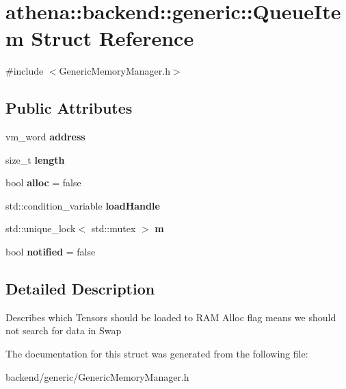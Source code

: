 \hypertarget{structathena_1_1backend_1_1generic_1_1_queue_item}{}\section{athena\+:\+:backend\+:\+:generic\+:\+:Queue\+Item Struct Reference}
\label{structathena_1_1backend_1_1generic_1_1_queue_item}


{\ttfamily \#include $<$Generic\+Memory\+Manager.\+h$>$}

\subsection*{Public Attributes}
\begin{DoxyCompactItemize}
\item 
\mbox{\label{structathena_1_1backend_1_1generic_1_1_queue_item_a9d1c0aa22d58d18392c2ae7bec943b07}} 
vm\+\_\+word {\bfseries address}
\item 
\mbox{\label{structathena_1_1backend_1_1generic_1_1_queue_item_a824170e499e70a8d2bd5c069579671a9}} 
size\+\_\+t {\bfseries length}
\item 
\mbox{\label{structathena_1_1backend_1_1generic_1_1_queue_item_aef5166382f4be9c116bc46e66556384a}} 
bool {\bfseries alloc} = false
\item 
\mbox{\label{structathena_1_1backend_1_1generic_1_1_queue_item_a563299ec884b7fea39492d0b8ba5d6d1}} 
std\+::condition\+\_\+variable {\bfseries load\+Handle}
\item 
\mbox{\label{structathena_1_1backend_1_1generic_1_1_queue_item_a796896fd631563c13a63557f5628fbb3}} 
std\+::unique\+\_\+lock$<$ std\+::mutex $>$ {\bfseries m}
\item 
\mbox{\label{structathena_1_1backend_1_1generic_1_1_queue_item_a3d4b8f15dfd8f58ac592988f00879e34}} 
bool {\bfseries notified} = false
\end{DoxyCompactItemize}


\subsection{Detailed Description}
Describes which Tensors should be loaded to R\+AM Alloc flag means we should not search for data in Swap 

The documentation for this struct was generated from the following file\+:\begin{DoxyCompactItemize}
\item 
backend/generic/Generic\+Memory\+Manager.\+h\end{DoxyCompactItemize}
